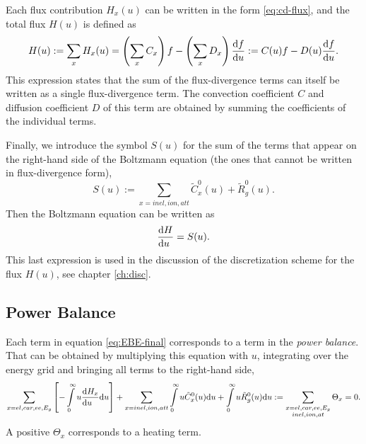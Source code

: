 \documentclass{book}
\begin{document}
Each flux contribution $H_x(u)$ can be written in the form \eqref{eq:cd-flux}, and
the total flux $H(u)$ is defined as
\begin{equation}
	H(u)
	:= \sum\limits_{x}H_x(u)
	= \left(\sum\limits_x C_x\right)f - \left(\sum\limits_x D_x\right)\DERIV{f}{u}
	:= C(u)f - D(u)\DERIV{f}{u}.
	\label{eq:cd-flux-total}
\end{equation}
This expression states that the sum of the flux-divergence terms can itself be
written as a single flux-divergence term. The convection coefficient $C$ and
diffusion coefficient $D$ of this term are obtained by summing the coefficients
of the individual terms.

Finally, we introduce the symbol $S(u)$ for the sum of the terms that appear
on the right-hand side of the Boltzmann equation (the ones that cannot be
written in flux-divergence form),
\begin{equation}
	S(u)
	:=
	\sum\limits_{x=inel,ion,att}\tilde{C}^0_{x}(u)
	+
	\tilde{R}^0_g(u).
	\label{eq:EBE-S}
\end{equation}
Then the Boltzmann equation can be written as
\begin{equation}
	\DERIV{H}{u} = S(u).
	\label{eq:be:dH/du=S}
\end{equation}
This last expression is used in the discussion of the discretization scheme for the
flux $H(u)$, see chapter \ref{ch:disc}.

\subsection{Power Balance}

Each term in equation \eqref{eq:EBE-final} corresponds to a term in the {\em power balance}.
That can be obtained by multiplying this equation with $u$, integrating over the energy grid
and bringing all terms to the right-hand side,
\begin{equation}
	  \sum\limits_{x=el,car,ee,E_g}\left[-\int\limits_0^\infty u\DERIV{H_x}{u}\dd{u}\right]
	+ \sum\limits_{x=inel,ion,att}\int\limits_0^\infty u\tilde{C}^0_{x}(u)\dd{u}
	+
	\int\limits_0^\infty u\tilde{R}^0_g(u)\dd{u}
	:= \sum\limits_{\substack{x=el,car,ee,E_g \\ inel,ion,at}} \Theta_x
	=0.
	\label{eq:EBE-power-balance}
\end{equation}
A positive $\Theta_x$ corresponds to a heating term.
\end{document}
